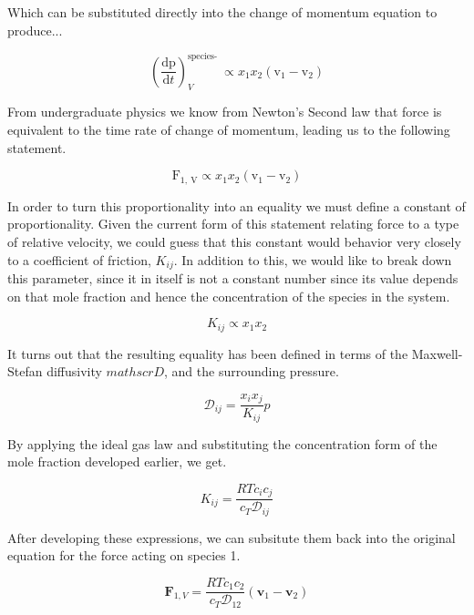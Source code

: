\documentclass[lettersize,journal]{IEEEtran}
\begin{document}
Which can be substituted directly into the change of momentum equation to produce...

\begin{equation}
  \left(\frac{\mathrm{d} \mathrm{p}}{\mathrm{d} t}\right)_{V}^{\text {species- }} \propto x_{1} x_{2}\left(\mathrm{v}_{1}-\mathrm{v}_{2}\right)
\end{equation}

From undergraduate physics we know from Newton's Second law that force is equivalent to the time rate of change of momentum, leading us to the following statement.

\begin{equation}
  \mathrm{F}_{1, \mathrm{~V}} \propto x_{1} x_{2}\left(\mathrm{v}_{1}-\mathrm{v}_{2}\right)
\end{equation}

In order to turn this proportionality into an equality we must define a constant of proportionality. Given the current form of this statement relating force to a type of relative velocity, we could guess that this constant would behavior very closely to a coefficient of friction, $K_{ij}$. In addition to this, we would like to break down this parameter, since it in itself is not a constant number since its value depends on that mole fraction and hence the concentration of the species in the system.

\begin{equation}
  K_{i j} \propto x_{1}x_{2}
\end{equation}

It turns out that the resulting equality has been defined in terms of the Maxwell-Stefan diffusivity $mathscr{D}$, and the surrounding pressure.

\begin{equation}
  \mathscr{D}_{i j}=\frac{x_{i} x_{j}}{K_{i j}} p
\end{equation}

By applying the ideal gas law and substituting the concentration form of the mole fraction developed earlier, we get.

\begin{equation}
  K_{i j}=\frac{R T c_{i} c_{j}}{c_{T} \mathscr{D}_{i j}}
\end{equation}

After developing these expressions, we can subsitute them back into the original equation for the force acting on species 1.

\begin{equation}\label{friction_force_1}
  \mathbf{F}_{1, V}=\frac{R T c_{1} c_{2}}{c_{T} \mathscr{D}_{12}}\left(\mathbf{v}_{1}-\mathbf{v}_{2}\right)
\end{equation}
\end{document}
